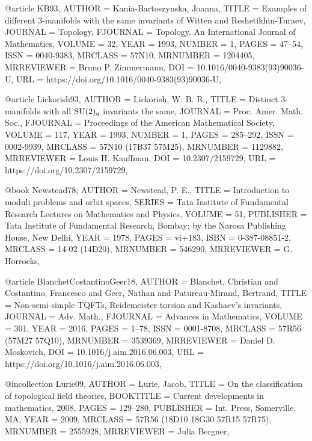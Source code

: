 @article {KB93,
    AUTHOR = {Kania-Bartoszynska, Joanna},
     TITLE = {Examples of different {$3$}-manifolds with the same invariants
              of {W}itten and {R}eshetikhin-{T}uraev},
   JOURNAL = {Topology},
  FJOURNAL = {Topology. An International Journal of Mathematics},
    VOLUME = {32},
      YEAR = {1993},
    NUMBER = {1},
     PAGES = {47--54},
      ISSN = {0040-9383},
   MRCLASS = {57N10},
  MRNUMBER = {1204405},
MRREVIEWER = {Bruno P. Zimmermann},
       DOI = {10.1016/0040-9383(93)90036-U},
       URL = {https://doi.org/10.1016/0040-9383(93)90036-U},
}

@article {Lickorish93,
    AUTHOR = {Lickorish, W. B. R.},
     TITLE = {Distinct {$3$}-manifolds with all {${\rm SU}(2)_q$} invariants
              the same},
   JOURNAL = {Proc. Amer. Math. Soc.},
  FJOURNAL = {Proceedings of the American Mathematical Society},
    VOLUME = {117},
      YEAR = {1993},
    NUMBER = {1},
     PAGES = {285--292},
      ISSN = {0002-9939},
   MRCLASS = {57N10 (17B37 57M25)},
  MRNUMBER = {1129882},
MRREVIEWER = {Louis H. Kauffman},
       DOI = {10.2307/2159729},
       URL = {https://doi.org/10.2307/2159729},
}

@book {Newstead78,
    AUTHOR = {Newstead, P. E.},
     TITLE = {Introduction to moduli problems and orbit spaces},
    SERIES = {Tata Institute of Fundamental Research Lectures on Mathematics
              and Physics},
    VOLUME = {51},
 PUBLISHER = {Tata Institute of Fundamental Research, Bombay; by the Narosa
              Publishing House, New Delhi},
      YEAR = {1978},
     PAGES = {vi+183},
      ISBN = {0-387-08851-2},
   MRCLASS = {14-02 (14D20)},
  MRNUMBER = {546290},
MRREVIEWER = {G. Horrocks},
}

@article {BlanchetCostantinoGeer18,
    AUTHOR = {Blanchet, Christian and Costantino, Francesco and Geer, Nathan
              and Patureau-Mirand, Bertrand},
     TITLE = {Non-semi-simple {TQFT}s, {R}eidemeister torsion and
              {K}ashaev's invariants},
   JOURNAL = {Adv. Math.},
  FJOURNAL = {Advances in Mathematics},
    VOLUME = {301},
      YEAR = {2016},
     PAGES = {1--78},
      ISSN = {0001-8708},
   MRCLASS = {57R56 (57M27 57Q10)},
  MRNUMBER = {3539369},
MRREVIEWER = {Daniel D. Moskovich},
       DOI = {10.1016/j.aim.2016.06.003},
       URL = {https://doi.org/10.1016/j.aim.2016.06.003},
}

@incollection {Lurie09,
    AUTHOR = {Lurie, Jacob},
     TITLE = {On the classification of topological field theories},
 BOOKTITLE = {Current developments in mathematics, 2008},
     PAGES = {129--280},
 PUBLISHER = {Int. Press, Somerville, MA},
      YEAR = {2009},
   MRCLASS = {57R56 (18D10 18G30 57R15 57R75)},
  MRNUMBER = {2555928},
MRREVIEWER = {Julia Bergner},
}

